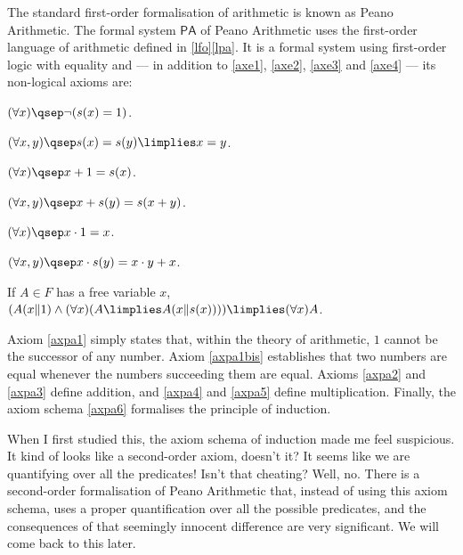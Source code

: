 \begin{example}
\begin{parlist}
\item \label{fspa} The standard first-order formalisation of arithmetic is known as Peano Arithmetic. The formal system $\mathsf{PA}$ of Peano Arithmetic uses the first-order language of arithmetic defined in \ref{lfo}\ref{lpa}. It is a formal system using first-order logic with equality and --- in addition to \ref{axe1}, \ref{axe2}, \ref{axe3} and \ref{axe4} --- its non-logical axioms are:
\begin{axioms}[PA]
\item \label{axpa1} $(\forall x)\qsep\lnot(s(x) = 1)$.
\item \label{axpa1bis} $(\forall x,y)\qsep s(x) = s(y) \limplies x = y$.
\item \label{axpa2} $(\forall x)\qsep x + 1 = s(x)$.
\item \label{axpa3} $(\forall x,y)\qsep x + s(y) = s(x+y)$.
\item \label{axpa4} $(\forall x)\qsep x \cdot 1 = x$.
\item \label{axpa5} $(\forall x,y)\qsep x \cdot s(y) = x\cdot y + x$.
\item \label{axpa6} If $A\in F$ has a free variable $x$, $(A(x\Vert1) \land (\forall x) (A \limplies A(x\Vert s(x)))) \limplies (\forall x) A$. 
\end{axioms}
Axiom \ref{axpa1} simply states that, within the theory of arithmetic, $1$ cannot be the successor of any number.
Axiom \ref{axpa1bis} establishes that two numbers are equal whenever the numbers succeeding them are equal.
Axioms \ref{axpa2} and \ref{axpa3} define addition, and \ref{axpa4} and \ref{axpa5} define multiplication. Finally, the axiom schema \ref{axpa6} formalises the principle of induction.

When I first studied this, the axiom schema of induction made me feel suspicious. It kind of looks like a second-order axiom, doesn't it? It seems like we are quantifying over all the predicates! Isn't that cheating? Well, no. There is a second-order formalisation of Peano Arithmetic that, instead of using this axiom schema, uses a proper quantification over all the possible predicates, and the consequences of that seemingly innocent difference are very significant. 
We will come back to this later.
\end{parlist}
\end{example}

